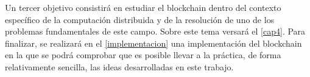 Un tercer objetivo consistirá en estudiar el blockchain dentro del contexto específico de la computación distribuida y de la resolución de uno de los problemas fundamentales de este campo. Sobre este tema versará el \ref{cap4}. Para finalizar, se realizará en el \ref{implementacion} una implementación del blockchain en la que se podrá comprobar que es posible llevar a la práctica, de forma relativamente sencilla, las ideas desarrolladas en este trabajo.









